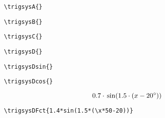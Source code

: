 \trigsysA{}
\begin{verbatim}
\trigsysA{}
\end{verbatim}

\trigsysB{}
\begin{verbatim}
\trigsysB{}
\end{verbatim}

\trigsysC{}
\begin{verbatim}
\trigsysC{}
\end{verbatim}

\trigsysD{}
\begin{verbatim}
\trigsysD{}
\end{verbatim}

\trigsysDsin{}
\begin{verbatim}
\trigsysDsin{}
\end{verbatim}

\trigsysDcos{}
\begin{verbatim}
\trigsysDcos{}
\end{verbatim}

$$0.7\cdot{}\sin(1.5\cdot{}(x-20^\circ))$$
\begin{verbatim}
\trigsysDFct{1.4*sin(1.5*(\x*50-20))}
\end{verbatim}


